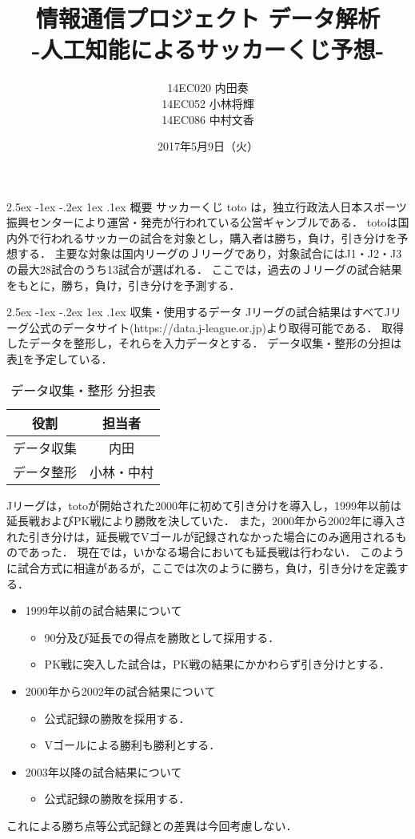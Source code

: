 \documentclass[twocolumn,10pt]{jarticle}
\title{\Large 情報通信プロジェクト データ解析\\ -人工知能によるサッカーくじ予想-}
\author{\normalsize14EC020 内田奏\\14EC052 小林将輝\\14EC086 中村文香}
\date{2017年5月9日（火）}
\makeatletter
\def\section{\@startsection {section}{1}{\z@}%
{2.5ex \@plus -1ex \@minus -.2ex}%
{1ex \@plus.1ex}%
{\sectionformat}}
\def\sectionformat{\normalsize\bf}
\makeatother
\begin{document}
\maketitle
\section{概要}
サッカーくじ toto は，独立行政法人日本スポーツ振興センターにより運営・発売が行われている公営ギャンブルである．
totoは国内外で行われるサッカーの試合を対象とし，購入者は勝ち，負け，引き分けを予想する．
主要な対象は国内リーグのＪリーグであり，対象試合にはJ1・J2・J3の最大28試合のうち13試合が選ばれる．
ここでは，過去のＪリーグの試合結果をもとに，勝ち，負け，引き分けを予測する．

\section{収集・使用するデータ}
Jリーグの試合結果はすべてJリーグ公式のデータサイト(https://data.j-league.or.jp)より取得可能である．
取得したデータを整形し，それらを入力データとする．
データ収集・整形の分担は表\ref{data}を予定している．
\begin{table}[htbp]
\centering
\caption{データ収集・整形 分担表} \label{data}
\begin{tabular}{cc} 
\hline
\textbf{役割}&\textbf{担当者}\\\hline
データ収集&内田\\
データ整形&小林・中村\\\hline
\end{tabular}
\end{table}

Jリーグは，totoが開始された2000年に初めて引き分けを導入し，1999年以前は延長戦およびPK戦により勝敗を決していた．
また，2000年から2002年に導入された引き分けは，延長戦でVゴールが記録されなかった場合にのみ適用されるものであった．
現在では，いかなる場合においても延長戦は行わない．
このように試合方式に相違があるが，ここでは次のように勝ち，負け，引き分けを定義する．
\begin{itemize}
\item{1999年以前の試合結果について}
\begin{itemize}
\item{90分及び延長での得点を勝敗として採用する．}
\item{PK戦に突入した試合は，PK戦の結果にかかわらず引き分けとする．}
\end{itemize}
\item{2000年から2002年の試合結果について}
\begin{itemize}
\item{公式記録の勝敗を採用する．}
\item{Vゴールによる勝利も勝利とする．}
\end{itemize}
\item{2003年以降の試合結果について}
\begin{itemize}
\item{公式記録の勝敗を採用する．}
\end{itemize}
\end{itemize}
これによる勝ち点等公式記録との差異は今回考慮しない．
\end{document}

